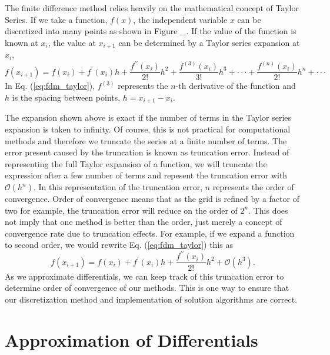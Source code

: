 The finite difference method relies heavily on the mathematical concept of 
Taylor Series.  If we take a function, $f(x)$, the 
independent variable $x$ can be discretized into many points as shown in Figure \_.
If the value of the function is known at $x_{i}$, the value at $x_{i+1}$ can be
determined by a Taylor series expansion at $x_{i}$,
\begin{equation}
     f\left(x_{i+1}\right) = f\left(x_{i}\right) + f^{\prime}\left(x_{i}\right)h + 
     \frac{f^{\prime\prime}\left(x_{i}\right)}{2!}h^{2} + 
     \frac{f^{\left(3\right)}\left(x_{i}\right)}{3!}h^{3}+\cdot\cdot\cdot + 
     \frac{f^{\left(n\right)}\left(x_{i}\right)}{2!}h^{n} + \cdot\cdot\cdot
  \label{eq:fdm_taylor}
\end{equation}
In Eq. (\ref{eq:fdm_taylor}), $f^{\left(3\right)}$ represents the $n$-th derivative of 
the function and $h$ is the spacing between points, $h = x_{i+1} - x_{i}$.
\par
The expansion shown above is exact if the number of terms in the Taylor series
expansion is taken to infinity. Of course, this is not practical for computational
methods and therefore we truncate the series at a finite number of terms. The error
present caused by the truncation is known as truncation error.
Instead of representing the full Taylor expansion of a function, we will truncate
the expression after a few number of terms and repesent the truncation error with
$\mathcal{O}\left(h^{n}\right)$. In this representation of the truncation error,
$n$ represents the order of convergence. Order of
convergence means that as the grid is refined by a factor of two for example, the
truncation error will reduce on the order of $2^{n}$. This does not imply that
one method is better than the order, just merely a concept of convergence rate
due to truncation effects. For example, if we expand a function to second order, we
would rewrite Eq. (\ref{eq:fdm_taylor}) this as
\begin{equation}
     f\left(x_{i+1}\right) = f\left(x_{i}\right) + f^{\prime}\left(x_{i}\right)h + 
     \frac{f^{\prime\prime}\left(x_{i}\right)}{2!}h^{2} + \mathcal{O}\left(h^{3}\right).
\end{equation}
As we approximate differentials, we can keep track of this truncation error to determine
order of convergence of our methods. This is one way to ensure that our discretization
method and implementation of solution algorithms are correct.

\section{Approximation of Differentials}
\label{sec:fdm_approx}

